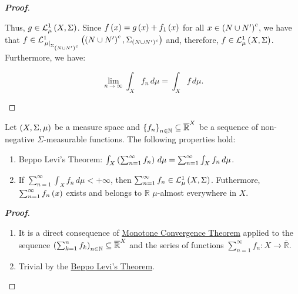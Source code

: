 \begin{theorem}
\begin{proof}[\rm\textbf{Proof}]
\begin{enumerate}
      Thus, $g\in\Leb{X}{\Sigma}{\mu}$. Since $f\pr{x}=g\pr{x}+f_1\pr{x}$ for all $x\in\pr{N\cup N'}^c$, we have that $f\in\Leb{\pr{N\cup N'}^c}{\Sigma_{\pr{N\cup N'}^c}}{\rest{\mu}{\Sigma_{\pr{N\cup N'}^c}}}$ and, therefore, $f\in\Leb{X}{\Sigma}{\mu}$. Furthermore, we have:

      \begin{equation}
        \lim_{n\to\infty}{\int_{X}{f_n\,d\mu}}=\int_{X}{f\,d\mu}.
      \end{equation}
    \end{enumerate}
  \end{proof}
\end{theorem}

\begin{corollary}
  Let $\pr{X,\Sigma,\mu}$ be a measure space and $\set{f_n}_{n\in\mathbb{N}}\subseteq\overline{\mathbb{R}}^X$ be a sequence of non-negative $\Sigma$-measurable functions. The following properties hold:
  \begin{enumerate}
    \item Beppo Levi's Theorem: $\int_{X}{\pr{\sum_{n=1}^{\infty}{f_n}}\,d\mu}=\sum_{n=1}^{\infty}{\int_{X}{f_n\,d\mu}}$.\label{Beppo Levi's Theorem}
    \item If $\sum_{n=1}^{\infty}{\int_{X}{f_n\,d\mu}<+\infty}$, then $\sum_{n=1}^{\infty}{f_n}\in\Leb{X}{\Sigma}{\mu}$. Futhermore, $\sum_{n=1}^{\infty}{f_n\pr{x}}$ exists and belongs to $\mathbb{R}$ $\mu$-almost everywhere in $X$.
  \end{enumerate}
  \begin{proof}[\rm\textbf{Proof}]
    \hfill
    \begin{enumerate}
      \item It is a direct consequence of \hyperref[Monotone Convergence Theorem]{Monotone Convergence Theorem} applied to the sequence $\pr{\sum_{k=1}^n{f_k}}_{n\in\mathbb{N}}\subseteq\overline{\mathbb{R}}^X$ and the series of functions $\sum_{n=1}^{\infty}{f_n}:X\rightarrow\overline{\mathbb{R}}$.
      \item Trivial by the \hyperref[Beppo Levi's Theorem]{Beppo Levi's Theorem}.
    \end{enumerate}
  \end{proof}
\end{corollary}

